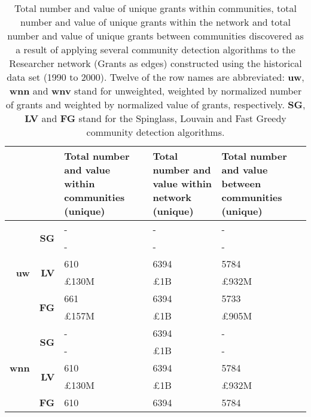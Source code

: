 \begin{table}[!htbp]
\centering
\caption[Total number and value of unique grants within communities, total number and value of unique grants within the network and total number and value of unique grants between communities discovered in the Researcher network (Grants as edges) constructed using the historical data set (1990 to 2000)]{Total number and value of unique grants within communities, total number and value of unique grants within the network and total number and value of unique grants between communities discovered as a result of applying several community detection algorithms to the Researcher network (Grants as edges) constructed using the historical data set (1990 to 2000). Twelve of the row names are abbreviated: \textbf{uw}, \textbf{wnn} and \textbf{wnv} stand for unweighted, weighted by normalized number of grants and weighted by normalized value of grants, respectively. \textbf{SG}, \textbf{LV} and \textbf{FG} stand for the Spinglass, Louvain and Fast Greedy community detection algorithms.}
\label{table:researcher_b_past2_grants2_appendix}
\begin{tabular}{r|r|>{\raggedleft\arraybackslash}p{3.5cm}|>{\raggedleft\arraybackslash}p{3.2cm}|>{\raggedleft\arraybackslash}p{3.5cm}}
\multicolumn{2}{c|}{} & \textbf{Total number and value within communities (unique)} & \textbf{Total number and value within network (unique)} & \textbf{Total number and value between communities (unique)}\\
\hline
\multirow{6}{*}{\textbf{uw}}
& \multirow{2}{*}{\textbf{SG}}
& {-} & {-} & {-}\\
& {} & {-} & {-} & {-}\\
\cline{2-5}
& \multirow{2}{*}{\textbf{LV}}
& {610} & {6394} & {5784}\\
& {} & {\pounds130M} & {\pounds1B} & {\pounds932M}\\
\cline{2-5}
& \multirow{2}{*}{\textbf{FG}}
& {661} & {6394} & {5733}\\
& {} & {\pounds157M} & {\pounds1B} & {\pounds905M}\\
\hline
\multirow{6}{*}{\textbf{wnn}}
& \multirow{2}{*}{\textbf{SG}}
& {-} & {6394} & {-}\\
& {} & {-} & {\pounds1B} & {-}\\
\cline{2-5}
& \multirow{2}{*}{\textbf{LV}}
& {610} & {6394} & {5784}\\
& {} & {\pounds130M} & {\pounds1B} & {\pounds932M}\\
\cline{2-5}
& \multirow{2}{*}{\textbf{FG}}
& {610} & {6394} & {5784}\\

\end{tabular}
\end{table}
